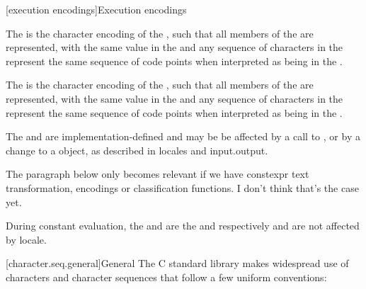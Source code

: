 \documentclass{wg21}
\begin{document}
\begin{addedblock}
[execution encodings]{Execution encodings}

The  is the character encoding of the , such that
all members of the  are represented, with the same value in the  and any sequence of characters
in the  represent the same sequence of code points when interpreted as being in the .

The  is the character encoding of the , such that
all members of the  are represented, with the same value in the  and any sequence of characters
in the  represent the same sequence of code points when interpreted as being in the .

The  and  are implementation-defined and may be be affected by a call to , or by a change to a  object, as described in locales and input.output.

\end{addedblock}

\begin{quoteblock}
The paragraph below only becomes relevant if we have constexpr text transformation, encodings or classification functions.
I don't think that's the case yet.
\end{quoteblock}

\begin{addedblock}
During constant evaluation, the  and  are the  and  respectively and are not affected by locale.

\end{addedblock}

[character.seq.general]{General}
\pnum
The C standard library makes widespread use
%
of characters and character sequences that follow a few uniform conventions:
\end{document}
